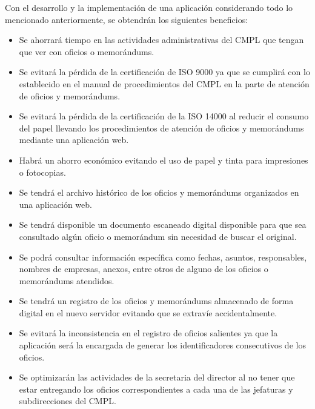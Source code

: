 Con el desarrollo y la implementación de una aplicación considerando todo lo mencionado anteriormente, se obtendrán los siguientes beneficios:
\begin{itemize}
	\item Se ahorrará tiempo en las actividades administrativas del CMPL que tengan que ver con oficios o memorándums.
	\item Se evitará la pérdida de la certificación de ISO 9000 ya que se cumplirá con lo establecido en el manual de procedimientos del CMPL en la parte de atención de oficios y memorándums.
	\item Se evitará la pérdida de la certificación de la ISO 14000 al reducir el consumo del papel llevando los procedimientos de atención de oficios y memorándums mediante una aplicación web.
	\item Habrá un ahorro económico evitando el uso de papel y tinta para impresiones o fotocopias.
	\item Se tendrá el archivo histórico de los oficios y memorándums organizados en una aplicación web.
	\item Se tendrá disponible un documento escaneado digital disponible para que sea consultado algún oficio o memorándum sin necesidad de buscar el original.
	\item Se podrá consultar información específica como fechas, asuntos, responsables, nombres de empresas, anexos, entre otros de alguno de los oficios o memorándums atendidos.
	\item Se tendrá un registro de los oficios y memorándums almacenado de forma digital en el nuevo servidor evitando que se extravíe accidentalmente.
	\item Se evitará la inconsistencia en el registro de oficios salientes ya que la aplicación será la encargada de generar los identificadores consecutivos de los oficios.
	\item Se optimizarán las actividades de la secretaria del director al no tener que estar entregando los oficios correspondientes a cada una de las jefaturas y subdirecciones del CMPL. 
\end{itemize}


